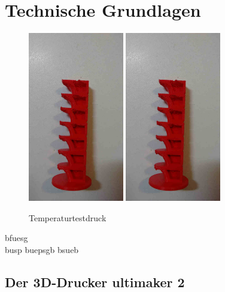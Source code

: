 \chapter{Technische Grundlagen}

\begin{figure}[h!]

	\includegraphics[height=20em]{images/techGr/Temperaturtest}
	\hspace*{1em}
	\includegraphics[height=20em]{images/techGr/Temperaturtest}
	\caption[Temperaturtest]{Temperaturtestdruck}
	\label{grafik:techGr:Temperaturtest}
\end{figure}


bfuesg \\
busp
buepsgb 
\vspace*{1em}
bsueb\\



\section{Der \ac{3D}-Drucker ultimaker 2}
\label{chapter:techGr:ultimaker2}